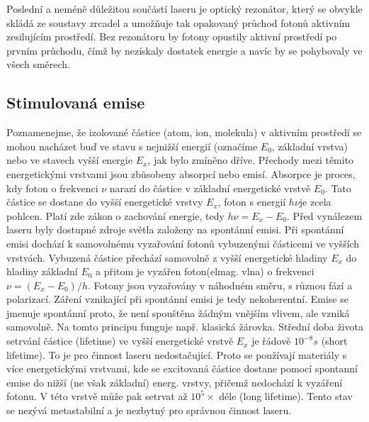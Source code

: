 \documentclass[a4paper,12pt]{article}
\begin{document}
Poslední a neméně důležitou součástí laseru je optický rezonátor, který se obvykle skládá ze soustavy zrcadel a umožňuje tak opakovaný průchod fotonů aktivním zesilujícím prostředí. Bez rezonátoru by fotony opustily aktivní prostředí po prvním průchodu, čímž by nezískaly dostatek energie a navíc by se pohybovaly ve všech směrech.

\subsection{Stimulovaná emise}
Poznamenejme, že izolované částice (atom, ion, molekula) v aktivním prostředí se mohou nacházet buď ve stavu s nejnižší energií (označíme $E_0$, základní vrstva) nebo ve stavech vyšší energie $E_x$, jak bylo zmíněno dříve. Přechody mezi těmito energetickými vrstvami jsou zbůsobeny absorpcí nebo emisí.
Absorpce je proces, kdy foton o frekvenci $\nu$ narazí do částice v základní energetické vrstvě $E_0$. Tato částice se dostane do vyšší energetické vrstvy $E_x$, foton s energií $h\nu$je zcela pohlcen. Platí zde zákon o zachování energie, tedy $h\nu = E_x - E_0$.
Před vynálezem laseru byly dostupné zdroje světla založeny na spontánní emisi. Při spontánní emisi dochází k samovolnému vyzařování fotonů vybuzenými částicemi ve vyšších vrstvách. Vybuzená částice přechází samovolně z vyšší energetické hladiny $E_x$ do hladiny základní $E_0$ a přitom je vyzářen foton(elmag. vlna) o frekvenci $\nu = (E_x-E_0)/h$. Fotony jsou vyzařovány v náhodném směru, s různou fází a polarizací. Záření vznikající při spontánní emisi je tedy nekoherentní. Emise se jmenuje spontánní proto, že není spouštěna žádným vnějším vlivem, ale vzniká samovolně. Na tomto principu funguje např. klasická žárovka.
Střední doba života setrvání částice (lifetime) ve vyšší energetické vrstvě $E_x$ je řádově $10^{-8}s$ (short lifetime). To je pro činnost laseru nedostačující. Proto se používají materiály s více energetickými vrstvami, kde se excitovaná částice dostane pomocí spontanní emise do nižší (ne však základní) energ. vrstvy, přičemž nedochází k vyzáření fotonu. V této vrstvě může pak setrvat až $10^{5}\times$ déle (long lifetime). Tento stav se nezývá metastabilní a je nezbytný pro správnou činnost laseru.
\end{document}
